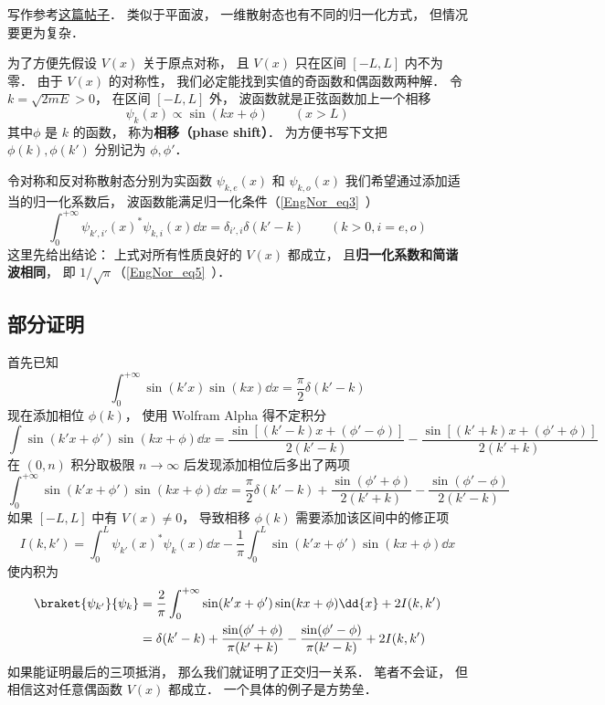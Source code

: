 
写作参考\href{https://chaoli.club/index.php/4541/last}{这篇帖子}． 类似于平面波， 一维散射态也有不同的归一化方式， 但情况要更为复杂． 

为了方便先假设 $V(x)$ 关于原点对称， 且 $V(x)$ 只在区间 $[-L,L]$ 内不为零． 由于 $V(x)$ 的对称性， 我们必定能找到实值的奇函数和偶函数两种解． 令 $k = \sqrt{2mE} > 0$， 在区间 $[-L,L]$ 外， 波函数就是正弦函数加上一个相移
\begin{equation}
\psi_k(x) \propto \sin(kx + \phi) \qquad (x > L)
\end{equation}
其中$\phi$ 是 $k$ 的函数， 称为\textbf{相移（phase shift）}． 为方便书写下文把 $\phi(k),\phi(k')$ 分别记为 $\phi, \phi'$．

令对称和反对称散射态分别为实函数 $\psi_{k,e}(x)$ 和 $\psi_{k,o}(x)$ 我们希望通过添加适当的归一化系数后， 波函数能满足归一化条件（\autoref{EngNor_eq3}~）%
\begin{equation}
\int_{0}^{+\infty} \psi_{k',i'}(x)^* \psi_{k,i}(x) \dd{x} = \delta_{i',i}\delta(k' - k) \qquad (k > 0, i = e, o)
\end{equation}
这里先给出结论： 上式对所有性质良好的 $V(x)$ 都成立， 且\textbf{归一化系数和简谐波相同}， 即 $1/\sqrt{\pi}$（\autoref{EngNor_eq5}~）．

\subsection{部分证明}
首先已知
\begin{equation}
\int_{0}^{+\infty} \sin(k'x)\sin(kx)\dd{x} = \frac{\pi}{2}\delta(k'-k)
\end{equation}
现在添加相位 $\phi(k)$， 使用 Wolfram Alpha 得不定积分
\begin{equation}
\int \sin(k'x+\phi')\sin(kx+\phi) \dd{x} = \frac{\sin[(k'-k)x + (\phi'-\phi)]}{2(k'-k)}
- \frac{\sin[(k'+k)x+(\phi'+\phi)]}{2(k'+k)}
\end{equation}
在 $(0,n)$ 积分取极限 $n\to\infty$ 后发现添加相位后多出了两项
\begin{equation}
\int_{0}^{+\infty} \sin(k'x+\phi')\sin(kx+\phi) \dd{x} = \frac{\pi}{2}\delta(k'-k)
+ \frac{\sin(\phi'+\phi)}{2(k'+k)} - \frac{\sin(\phi'-\phi)}{2(k'-k)}
\end{equation}
如果 $[-L,L]$ 中有 $V(x) \ne 0$， 导致相移 $\phi(k)$ 需要添加该区间中的修正项
\begin{equation}
I(k,k') = \int_0^L \psi_{k'}(x)^* \psi_k(x) \dd{x}
-\frac{1}{\pi}\int_{0}^{L} \sin(k'x+\phi')\sin(kx+\phi) \dd{x}
\end{equation}
使内积为
\begin{equation}
\begin{aligned}
\braket{\psi_{k'}}{\psi_k} &= \frac{2}{\pi}\int_{0}^{+\infty} \sin(k'x+\phi')\sin(kx+\phi) \dd{x} + 2I(k,k')\\
&= \delta(k'-k) + \frac{\sin(\phi'+\phi)}{\pi(k'+k)} - \frac{\sin(\phi'-\phi)}{\pi(k'-k)} + 2I(k,k')
\end{aligned}
\end{equation}
如果能证明最后的三项抵消， 那么我们就证明了正交归一关系． 笔者不会证， 但相信这对任意偶函数 $V(x)$ 都成立． 一个具体的例子是方势垒．


